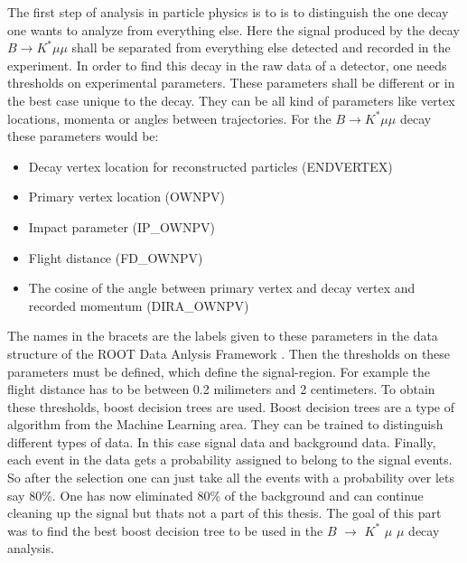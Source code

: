 \documentclass[english]{uzhpub}
\begin{document}
The first step of analysis in particle physics is to is to distinguish the one decay one wants to analyze from everything else. Here the signal produced by the decay $B \rightarrow K^* \mu \mu$ shall be separated from everything else detected and recorded in the experiment.
In order to find this decay in the raw data of a detector, one needs thresholds on experimental parameters. These parameters shall be different or in the best case unique to the decay. They can be all kind of parameters like vertex locations, momenta  or angles between trajectories.
For the $B \rightarrow K^* \mu \mu$ decay these parameters would be:
\begin{itemize}
 \item Decay vertex location for reconstructed particles (ENDVERTEX)
 \item Primary vertex location (OWNPV)
 \item Impact parameter (IP\_OWNPV)
 \item Flight distance (FD\_OWNPV)
 \item The cosine of the angle between primary vertex and decay vertex and recorded momentum (DIRA\_OWNPV)
\end{itemize}
The names in the bracets are the labels given to these parameters in the data structure of the ROOT Data Anlysis Framework \cite{bib:root}.
Then the thresholds on these parameters must be defined, which define the signal-region. For example the flight distance has to be between 0.2 milimeters and 2 centimeters.
To obtain these thresholds, boost decision trees are used. Boost decision trees are a type of algorithm from the Machine Learning area. They can be trained to distinguish different types of data. In this case signal data and background data.
Finally, each event in the data gets a probability assigned to belong to the signal events. So after the selection one can just take all the events with a probability over lets say 80\%. One has now eliminated 80\% of the background and can continue cleaning up the signal but thats not a part of this thesis. The goal of this part was to find the best boost decision tree to be used in the  $B$ $\rightarrow$ $K^{*}$ $\mu$ $\mu$ decay analysis. \\
\end{document}
